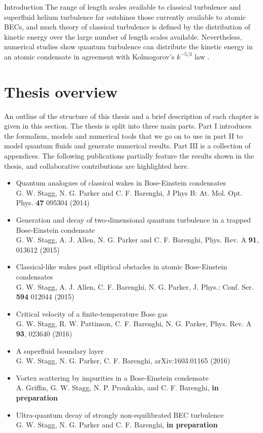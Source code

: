 \begin{chapter}{\label{cha:bose_gases}Introduction}
The range of length scales available to classical turbulence and superfluid helium turbulence far outshines those currently available to atomic BECs, and much theory of classical turbulence is defined by the distribution of kinetic energy over the large number of length scales available. Nevertheless, numerical studies show quantum turbulence can distribute the kinetic energy in an atomic condensate in agreement with Kolmogorov's $k^{-5/3}$ law \cite{Nore,Kobayashi,PhysRevLett.103.084501}.

\section{Thesis overview}
An outline of the structure of this thesis and a brief description of each chapter is given in this section. The thesis is split into three main parts. Part I introduces the formalism, models and numerical tools that we go on to use in part II to model quantum fluids and generate numerical results. Part III is a collection of appendices. The following publications partially feature the results shown in the thesis, and collaborative contributions are highlighted here.
\begin{itemize}
	\item Quantum analogues of classical wakes in Bose-Einstein condensates\\
	{\footnotesize G. W. Stagg, N. G. Parker and C. F. Barenghi, J Phys B: At. Mol. Opt. Phys. {\bf 47} 095304 (2014)}
	\item Generation and decay of two-dimensional quantum turbulence in a trapped Bose-Einstein condensate\\
	{\footnotesize G. W. Stagg, A. J. Allen, N. G. Parker and C. F. Barenghi, Phys. Rev. A {\bf 91}, 013612 (2015)}
	\item Classical-like wakes past elliptical obstacles in atomic Bose-Einstein condensates\\
	{\footnotesize G. W. Stagg, A. J. Allen, C. F. Barenghi, N. G. Parker, J. Phys.: Conf. Ser. {\bf 594} 012044 (2015)}
	\item Critical velocity of a finite-temperature Bose gas\\
	{\footnotesize G. W. Stagg, R. W. Pattinson, C. F. Barenghi, N. G. Parker, Phys. Rev. A {\bf 93}, 023640 (2016)}
	\item A superfluid boundary layer\\
	{\footnotesize G. W. Stagg, N. G. Parker, C. F. Barenghi, arXiv:1603.01165 (2016)}
	\item Vortex scattering by impurities in a Bose-Einstein condensate\\
	{\footnotesize A. Griffin, G. W. Stagg, N. P. Proukakis, and C. F. Barenghi, {\bf in preparation}}
	\item Ultra-quantum decay of strongly non-equilibrated BEC turbulence\\
	{\footnotesize G. W. Stagg, N. G. Parker and C. F. Barenghi, {\bf in preparation}}
\end{itemize}


\end{chapter}
